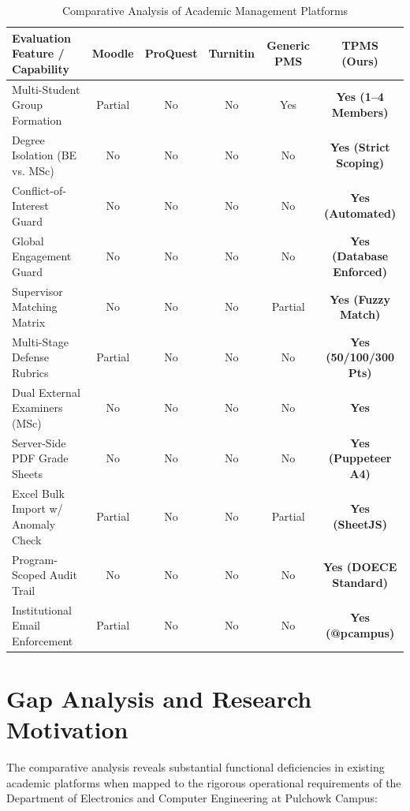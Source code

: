 \begin{table}[H]
\centering
\small
\caption{Comparative Analysis of Academic Management Platforms}
\label{tab:literature_comparison}
\vspace{6pt}
\begin{tabularx}{\textwidth}{|l|c|c|c|c|c|}
\hline
\textbf{Evaluation Feature / Capability} & \textbf{Moodle} & \textbf{ProQuest} & \textbf{Turnitin} & \textbf{Generic PMS} & \textbf{TPMS (Ours)} \\
\hline
Multi-Student Group Formation & Partial & No & No & Yes & \textbf{Yes (1--4 Members)} \\
Degree Isolation (BE vs. MSc) & No & No & No & No & \textbf{Yes (Strict Scoping)} \\
Conflict-of-Interest Guard & No & No & No & No & \textbf{Yes (Automated)} \\
Global Engagement Guard & No & No & No & No & \textbf{Yes (Database Enforced)} \\
Supervisor Matching Matrix & No & No & No & Partial & \textbf{Yes (Fuzzy Match)} \\
Multi-Stage Defense Rubrics & Partial & No & No & No & \textbf{Yes (50/100/300 Pts)} \\
Dual External Examiners (MSc) & No & No & No & No & \textbf{Yes} \\
Server-Side PDF Grade Sheets & No & No & No & No & \textbf{Yes (Puppeteer A4)} \\
Excel Bulk Import w/ Anomaly Check & Partial & No & No & Partial & \textbf{Yes (SheetJS)} \\
Program-Scoped Audit Trail & No & No & No & No & \textbf{Yes (DOECE Standard)} \\
Institutional Email Enforcement & Partial & No & No & No & \textbf{Yes (@pcampus)} \\
\hline
\end{tabularx}
\end{table}

\section{Gap Analysis and Research Motivation}
The comparative analysis reveals substantial functional deficiencies in existing academic platforms when mapped to the rigorous operational requirements of the Department of Electronics and Computer Engineering at Pulchowk Campus:


